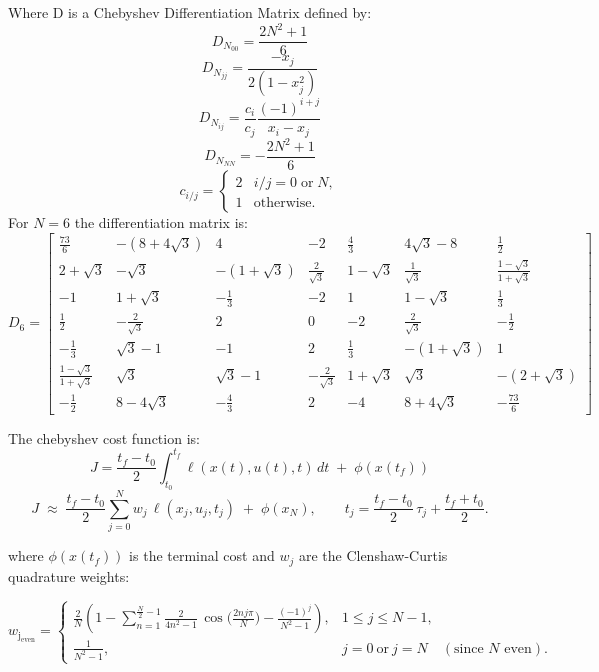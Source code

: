 \documentclass[]{article}
\begin{document}
Where D is a Chebyshev Differentiation Matrix defined by:
	\[
       D_{N_{00}}=\frac{2N^2+1}{6}
        \]
	\[
       D_{N_{jj}}=\frac{-x_j}{2(1-x_j^2)}
        \]
	\[
       D_{N_{ij}}=\frac{c_i}{c_j}\frac{(-1)^{i+j}}{x_i-x_j}
        \]
	\[
       D_{N_{NN}}=-\frac{2N^2+1}{6}
        \]
	\[
        c_{i/j}=
        \begin{cases}
        2 & i/j = 0 \;\text{or}\; N, \\
        1 & \text{otherwise}.
        \end{cases}
        \]
For $N=6$ the differentiation matrix is:
        \[
        D_{6} =
        \begin{bmatrix}
        \frac{73}{6} & -(8+4\sqrt{3})  & 4 & -2 & \frac{4}{3} & 4\sqrt{3} - 8 & \frac{1}{2}\\
        2+\sqrt{3} & -\sqrt{3} & -(1+\sqrt{3}) & \frac{2}{\sqrt{3}} & 1-\sqrt{3} & \frac{1}{\sqrt{3}} & \frac{1-\sqrt{3}}{1+\sqrt{3}}\\
        -1 & 1+\sqrt{3} & -\frac{1}{3} & -2 & 1 & 1-\sqrt{3} & \frac{1}{3}\\
        \frac{1}{2} & -\frac{2}{\sqrt{3}} & 2 & 0 & -2 & \frac{2}{\sqrt{3}} & -\frac{1}{2}\\
        -\frac{1}{3} & \sqrt{3}-1 & -1 & 2 & \frac{1}{3} & -(1+\sqrt{3}) & 1\\
        \frac{1-\sqrt{3}}{1+\sqrt{3}} & \sqrt{3} & \sqrt{3}-1 & -\frac{2}{\sqrt{3}} & 1+\sqrt{3} & \sqrt{3} &-( 2+\sqrt{3})\\
        -\frac{1}{2} & 8-4\sqrt{3} & -\frac{4}{3} & 2 & -4 & 8+4\sqrt{3} &  -\frac{73}{6}
        \end{bmatrix}
        \]
        
        The chebyshev cost function is:
        	\[
	J=\frac{t_f-t_0}{2}\int_{t_0}^{t_f} \ell(x(t),u(t),t)\,dt \;+\; \phi(x(t_f))
        \]
        \[
        J \;\approx\; \frac{t_f-t_0}{2} \sum_{j=0}^{N} w_j \,\ell(x_j,u_j,t_j)
        \;+\; \phi(x_N),
        \qquad t_j = \frac{t_f-t_0}{2}\,\tau_j + \frac{t_f+t_0}{2}.
        \]
        	
        where $\phi(x(t_f))$ is the terminal cost and  $w_j$ are the Clenshaw-Curtis quadrature weights:

        \[
        w_{\mathrm{j_{even}}} =
        \begin{cases}
        \displaystyle
        \frac{2}{N}\!\left(
        1 - \sum_{n=1}^{\frac{N}{2}-1} \frac{2}{4n^{2}-1}\,
        \cos\!\Big(\tfrac{2 n j \pi}{N}\Big)
        -\frac{(-1)^{j}}{N^{2}-1}
        \right), & 1 \le j \le N-1, \\[2.0ex]
        \displaystyle \frac{1}{N^{2}-1}, & j=0\ \text{or}\ j=N \quad(\text{since \(N\) even}).
        \end{cases}
        \]
\end{document}

